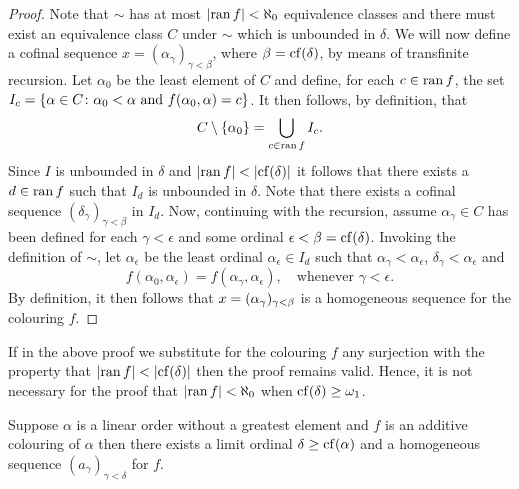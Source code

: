 \begin{proof}
        Note that $\sim$ has at most $\left\lvert\operatorname{ran} f\right\rvert<\aleph_0$ equivalence classes and there must exist an equivalence class $C$ under $\sim$ which is unbounded in $\delta$.  We will now define a cofinal sequence $x=(\alpha_{\gamma})_{\gamma<\beta}$, where $\beta=\operatorname{cf}(\delta)$, by means of transfinite recursion.  Let $\alpha_0$ be the least element of $C$ and define, for each $c\in\operatorname{ran} f$, the set $I_c=\{ \alpha\in C\colon \alpha_0<\alpha\text{ and }f(\alpha_0,\alpha)=c \}$.  It then follows, by definition, that
        \begin{equation}
            C\setminus\{\alpha_0\}=\bigcup_{c\in\operatorname{ran} f}I_c.
        \end{equation}
        Since $I$ is unbounded in $\delta$ and $\left\lvert\operatorname{ran} f\right\rvert<\left\lvert\operatorname{cf}(\delta)\right\rvert$ it follows that there exists a $d\in\operatorname{ran} f$ such that $I_d$ is unbounded in $\delta$.  Note that there exists a cofinal sequence $(\delta_\gamma)_{\gamma<\beta}$ in $I_d$.  Now, continuing with the recursion, assume $\alpha_\gamma\in C$ has been defined for each $\gamma<\epsilon$ and some ordinal $\epsilon<\beta=\operatorname{cf}(\delta)$.  Invoking the definition of $\sim$, let $\alpha_\epsilon$ be the least ordinal $\alpha_\epsilon\in I_d$ such that $\alpha_\gamma<\alpha_\epsilon$, $\delta_\gamma<\alpha_\epsilon$ and
        \begin{equation}
            f(\alpha_0,\alpha_\epsilon)=f(\alpha_\gamma,\alpha_\epsilon),\quad\text{whenever }\gamma<\epsilon.
        \end{equation}
        By definition, it then follows that $x=(\alpha_\gamma)_{\gamma<\beta}$ is a homogeneous sequence for the colouring $f$.
    \end{proof}

    \begin{rem}
        If in the above proof we substitute for the colouring $f$ any surjection with the property that $\left\lvert\operatorname{ran} f\right\rvert<\left\lvert\operatorname{cf}(\delta)\right\rvert$ then the proof remains valid.  Hence, it is not necessary for the proof that $\left\lvert\operatorname{ran} f\right\rvert<\aleph_0$ when $\operatorname{cf}(\delta)\geq\omega_1$.
    \end{rem}


    \begin{cor}
        Suppose $\alpha$ is a linear order without a greatest element and $f$ is an additive colouring of $\alpha$ then there exists a limit ordinal $\delta\geq\operatorname{cf}(\alpha)$ and a homogeneous sequence $(a_\gamma)_{\gamma<\delta}$ for $f$.
    \end{cor}

